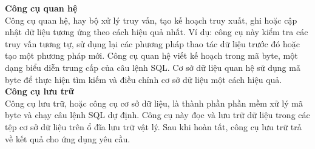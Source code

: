 
\hspace*{0.5cm}\textbf{Công cụ quan hệ}\\
\hspace*{0.5cm}Công cụ quan hệ, hay bộ xử lý truy vấn, tạo kế hoạch truy xuất, ghi hoặc cập nhật dữ liệu tương ứng theo cách hiệu quả nhất. Ví dụ: công cụ này kiểm tra các truy vấn tương tự, sử dụng lại các phương pháp thao tác dữ liệu trước đó hoặc tạo một phương pháp mới. Công cụ quan hệ viết kế hoạch trong mã byte, một dạng biểu diễn trung cấp của câu lệnh SQL. Cơ sở dữ liệu quan hệ sử dụng mã byte để thực hiện tìm kiếm và điều chỉnh cơ sở dữ liệu một cách hiệu quả.\\
\hspace*{0.5cm}\textbf{Công cụ lưu trữ}\\
\hspace*{0.5cm}Công cụ lưu trữ, hoặc công cụ cơ sở dữ liệu, là thành phần phần mềm xử lý mã byte và chạy câu lệnh SQL dự định. Công cụ này đọc và lưu trữ dữ liệu trong các tệp cơ sở dữ liệu trên ổ đĩa lưu trữ vật lý. Sau khi hoàn tất, công cụ lưu trữ trả về kết quả cho ứng dụng yêu cầu.
